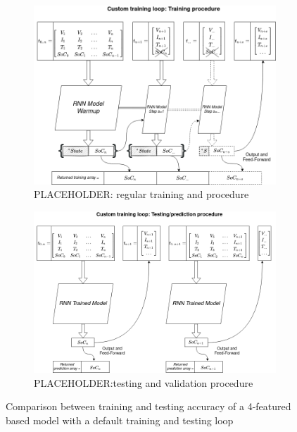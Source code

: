 \begin{figure}[htbp]
    \centering
    \begin{subfigure}[b]{0.85\textwidth}
        \centering
        \includegraphics[width=\linewidth]{II_Body/images/Autoregression-Training.png}
        \caption{PLACEHOLDER: regular training and  procedure}
        \label{subfig:testing}
    \end{subfigure}
    \hfill
    \begin{subfigure}[b]{0.85\textwidth}
        \centering
        \includegraphics[width=\linewidth]{II_Body/images/Autoregression-Testing.png}
        \caption{PLACEHOLDER:testing and validation procedure}
        \label{subfig:training}
    \end{subfigure}
    \caption{Comparison between training and testing accuracy of a 4-featured based model with a default training and testing loop}
    \label{fig:training_testing}
\end{figure}

